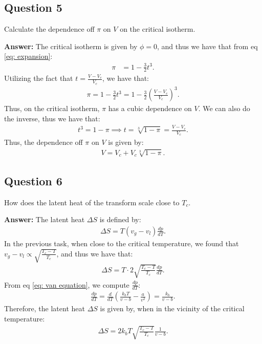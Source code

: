 \documentclass[a4paper]{article}
\newcommand{\newparagraph}{\vspace{.5cm}\noindent}
\begin{document}
\subsection*{Question 5}
Calculate the dependence off $\pi$ on $V$ on the critical isotherm.

\newparagraph
\textbf{Answer: }The critical isotherm is given by $\phi = 0$, and thus we have that from eq \eqref{eq: expansion}:
\begin{align*}
    \pi &= 1 - \frac{3}{2}t^3.
\end{align*}Utilizing the fact that $t = \frac{V - V_c}{V_c}$, we have that:
\begin{align*}
    \pi  =1  -\frac{3}{2}t^3 =1 -\frac{3}{2}\left(\frac{V - V_c}{V_c}\right)^3.
\end{align*}Thus, on the critical isotherm, $\pi$ has a cubic dependence on $V$. We can also do the inverse, thus we have that:
\begin{align*}
    t^3 = 1 - \pi \implies t = \sqrt[3]{1 - \pi} = \frac{V - V_c}{V_c}.
\end{align*}Thus, the dependence off $\pi$ on $V$ is given by:
\begin{align*}
    V = V_c + V_c\sqrt[3]{1 - \pi}.
\end{align*}


\subsection*{Question 6}
How does the latent heat of the transform scale close to $T_c$.

\newparagraph
\textbf{Answer: }The latent heat $\Delta S$ is defined by:
\begin{align*}
    \Delta S = T(v_g - v_l)\frac{dp}{dT}.
\end{align*}In the previous task, when close to the critical temperature, we found that $v_g - v_l \propto \sqrt{\frac{T_c - T}{T_c}}$, and thus we have that:
\begin{align*}
    \Delta S = T \cdot 2 \sqrt{\frac{T_c - T}{T_c}}\frac{dp}{dT}.
\end{align*}From eq \eqref{eq: van equation}, we compute $\frac{dp}{dT}$:
\begin{align*}
    \frac{dp}{dT} = \frac{d}{dT}\left(\frac{k_bT}{v - b} - \frac{a}{v^2}\right) = \frac{k_b}{v - b}.
\end{align*}Therefore, the latent heat $\Delta S$ is given by, when in the vicinity of the critical temperature:
\begin{align*}
    \Delta S = 2k_bT\sqrt{\frac{T_c - T}{T_c}}\frac{1}{v - b}.
\end{align*}
\end{document}
